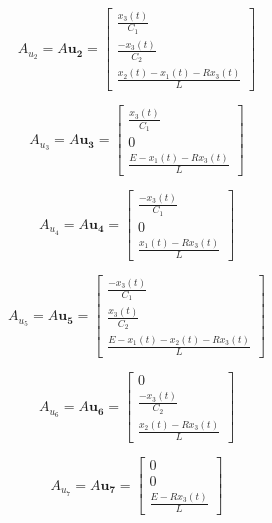 \begin{equation}
	A_{u_2}=A \mathbf{u_2}=
	\left[
		\begin{array}{c}
			\frac{x_3(t)}{C_1} \\
			\frac{-x_3(t)}{C_2} \\
			\frac{x_2(t)-x_1(t)-R x_3(t)}{L}
		\end{array}
	\right]
\end{equation}

\begin{equation}
	A_{u_3}=A \mathbf{u_3}=
	\left[
		\begin{array}{c}
			\frac{x_3(t)}{C_1} \\
			0 \\
			\frac{E-x_1(t)-R x_3(t)}{L}
		\end{array}
	\right]
\end{equation}

\begin{equation}
	A_{u_4}=A \mathbf{u_4}=
	\left[
		\begin{array}{c}
			\frac{-x_3(t)}{C_1} \\
			0 \\
			\frac{x_1(t)-R x_3(t)}{L}
		\end{array}
	\right]
\end{equation}

\begin{equation}
	A_{u_5}=A \mathbf{u_5}=
	\left[
		\begin{array}{c}
			\frac{-x_3(t)}{C_1} \\
			\frac{x_3(t)}{C_2} \\
			\frac{E-x_1(t)-x_2(t)-R x_3(t)}{L}
		\end{array}
	\right]
\end{equation}

\begin{equation}
	A_{u_6}=A \mathbf{u_6}=
	\left[
		\begin{array}{c}
			0 \\
			\frac{-x_3(t)}{C_2} \\
			\frac{x_2(t)-R x_3(t)}{L}
		\end{array}
	\right]
\end{equation}

\begin{equation}
	A_{u_7}=A \mathbf{u_7}=
	\left[
		\begin{array}{c}
			0 \\
			0 \\
			\frac{E-R x_3(t)}{L}
		\end{array}
	\right]
\end{equation}

